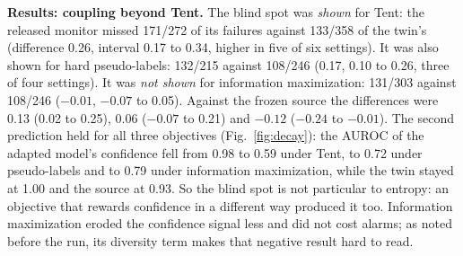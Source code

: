 \documentclass[runningheads]{llncs}
\begin{document}
\begin{table}[t]
\caption{Frozen test of the family-validated alarm on unused data (Tent at $10^{-3}$, held-out streams). Missed: clear failures with no alarm. Matched: missed share at a hindsight 5\% false-alarm level per setting.}
\label{tab:fv}
\centering\footnotesize\setlength{\tabcolsep}{4pt}
\end{table}

\textbf{Results: coupling beyond Tent.} The blind spot was \emph{shown} for Tent: the released monitor missed 171/272 of its failures against 133/358 of the twin's (difference 0.26, interval 0.17 to 0.34, higher in five of six settings). It was also shown for hard pseudo-labels: 132/215 against 108/246 (0.17, 0.10 to 0.26, three of four settings). It was \emph{not shown} for information maximization: 131/303 against 108/246 ($-0.01$, $-0.07$ to 0.05). Against the frozen source the differences were 0.13 (0.02 to 0.25), 0.06 ($-0.07$ to 0.21) and $-0.12$ ($-0.24$ to $-0.01$). The second prediction held for all three objectives (Fig.~\ref{fig:decay}): the AUROC of the adapted model's confidence fell from 0.98 to 0.59 under Tent, to 0.72 under pseudo-labels and to 0.79 under information maximization, while the twin stayed at 1.00 and the source at 0.93. So the blind spot is not particular to entropy: an objective that rewards confidence in a different way produced it too. Information maximization eroded the confidence signal less and did not cost alarms; as noted before the run, its diversity term makes that negative result hard to read.
\end{document}
